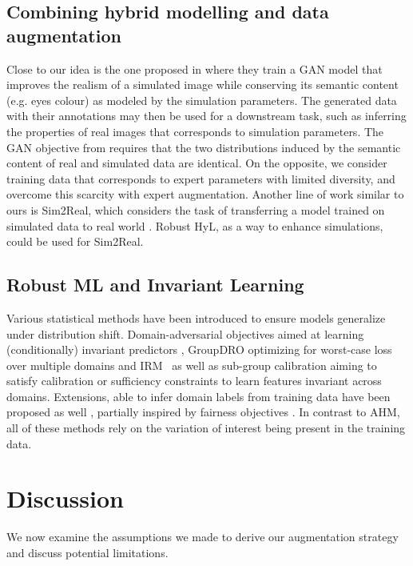 \subsection{Combining hybrid modelling and data augmentation}
Close to our idea is the one proposed in \citet{gan_hl} where they train a GAN model that improves the realism of a simulated image while conserving its semantic content (e.g. eyes colour) as modeled by the simulation parameters. The generated data with their annotations may then be used for a downstream task, such as inferring the properties of real images that corresponds to simulation parameters. The GAN objective from \citet{gan_hl} requires that the two distributions induced by the semantic content of real and simulated data are identical. On the opposite, we consider training data that corresponds to expert parameters with limited diversity, and overcome this scarcity with expert augmentation. Another line of work similar to ours is Sim2Real, which considers the task of transferring a model trained on simulated data to real world \citep{sim2real-1, sim2real-2, sim2real-3}. Robust HyL, as a way to enhance simulations, could be used for Sim2Real.

\subsection{Robust ML and Invariant Learning}
Various statistical methods have been introduced to ensure models generalize under distribution shift. Domain-adversarial objectives aimed at learning (conditionally) invariant predictors \citep{ganin2016domain,zhang2017aspect,li2018deep}, GroupDRO \citep{groupDRO_ICLR} optimizing for worst-case loss over multiple domains and IRM~\citep{IRM} as well as sub-group calibration \citep{wald2021calibration} aiming to satisfy calibration or sufficiency constraints to learn features invariant across domains. Extensions, able to infer domain labels from training data have been proposed as well \citep{lahoti2020fairness,creager2021environment}, partially inspired by fairness objectives \citep{hebert2018multicalibration,kim2019multiaccuracy}. In contrast to AHM, all of these methods rely on the variation of interest being present in the training data.

\section{Discussion}
We now examine the assumptions we made to derive our augmentation strategy and discuss potential limitations.
